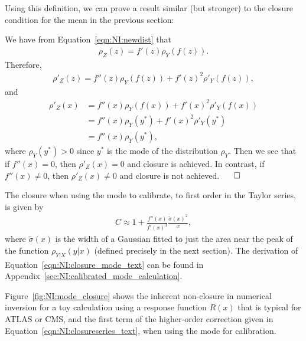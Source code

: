 \noindent Using this definition, we can prove a result similar (but stronger) to the closure condition for the mean in the previous section:

\vspace{5mm}


\vspace{5mm}

 We have from Equation~\ref{eqn:NI:newdist} that
\begin{align}
\rho_Z(z) = f'(z)\rho_Y(f(z)).
\end{align}
Therefore,
\begin{align}
\rho'_Z(z) = f''(z)\rho_Y(f(z))+f'(z)^2\rho'_Y(f(z)),
\end{align}
and
\begin{align}
\rho'_Z(x) &= f''(x)\rho_Y(f(x))+f'(x)^2\rho'_Y(f(x))\nonumber\\
&=f''(x)\rho_Y(y^*)+f'(x)^2\rho'_Y(y^*)\nonumber\\
&=f''(x)\rho_Y(y^*),
\end{align}
where $\rho_Y(y^*)>0$ since $y^*$ is the mode of the distribution $\rho_Y$. Then we see that if $f''(x)=0$, then $\rho'_Z(x)=0$ and closure is achieved.  In contrast, if $f''(x)\ne 0$, then $\rho'_Z(x)\ne 0$ and closure is not achieved. $\hspace{0.5 cm}\Box$

\vspace{5mm}

\noindent The closure when using the mode to calibrate, to first order in the Taylor series, is given by
\begin{align}
C \approx 1+\frac{f''(x)}{f'(x)^3}\frac{\tilde{\sigma}(x)^2}{x},
\label{eqn:NI:closure_mode_text}
\end{align}
where $\tilde{\sigma}(x)$ is the width of a Gaussian fitted to just the area near the peak of the function $\rho_{Y|X}(y|x)$ (defined precisely in the next section). The derivation of Equation~\ref{eqn:NI:closure_mode_text} can be found in Appendix~\ref{sec:NI:calibrated_mode_calculation}.

Figure~\ref{fig:NI:mode_closure} shows the inherent non-closure in numerical inversion for a toy calculation using a response function $R(x)$ that is typical for ATLAS or CMS, and the first term of the higher-order correction given in Equation~\ref{eqn:NI:closureseries_text}, when using the mode for calibration.

